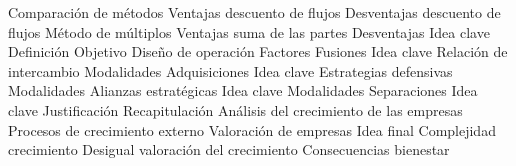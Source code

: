 \documentclass{nuevotema}
\begin{document}
\begin{esquema}[enumerate]
		\2 Comparación de métodos
			\3 Ventajas descuento de flujos
			\3 Desventajas descuento de flujos
			\3 Método de múltiplos
			\3 Ventajas suma de las partes
			\3 Desventajas
	\1 
		\2 Idea clave
			\3 Definición
			\3 Objetivo
			\3 Diseño de operación
			\3 Factores
		\2 Fusiones
			\3 Idea clave
			\3 Relación de intercambio
			\3 Modalidades
		\2 Adquisiciones
			\3 Idea clave
			\3 Estrategias defensivas
			\3 Modalidades
		\2 Alianzas estratégicas
			\3 Idea clave
			\3 Modalidades
		\2 Separaciones
			\3 Idea clave
			\3 Justificación
	\1[] 
		\2 Recapitulación
			\3 Análisis del crecimiento de las empresas
			\3 Procesos de crecimiento externo
			\3 Valoración de empresas
		\2 Idea final
			\3 Complejidad crecimiento
			\3 Desigual valoración del crecimiento
			\3 Consecuencias bienestar

\end{esquema}

\esquemalargo
\end{document}
